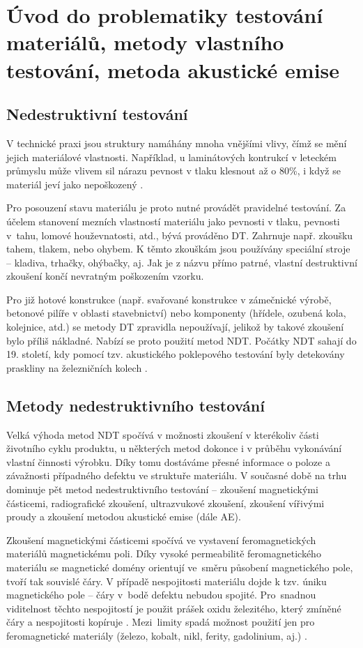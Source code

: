 \chapter{Úvod do problematiky testování materiálů, metody vlastního testování, metoda akustické emise}

\section{Nedestruktivní testování}
V technické praxi jsou struktury namáhány mnoha vnějšími vlivy, čímž se mění jejich materiálové vlastnosti. Například, u laminátových kontrukcí v leteckém průmyslu může vlivem sil nárazu pevnost v tlaku klesnout až o 80\%, i když se materiál jeví jako nepoškozený \cite{Benes_podklad_advances}. 

Pro posouzení stavu materiálu je proto nutné provádět pravidelné testování.
Za účelem stanovení mezních vlastností materiálu jako pevnosti v tlaku, pevnosti v~tahu, lomové houževnatosti, atd., bývá prováděno \ac{DT}. Zahrnuje např. zkoušku tahem, tlakem, nebo ohybem. K těmto zkouškám jsou používány speciální stroje – kladiva, trhačky, ohýbačky, aj. Jak je z názvu přímo patrné, vlastní destruktivní zkoušení končí nevratným poškozením vzorku. 

Pro již hotové konstrukce (např. svařované konstrukce v zámečnické výrobě, betonové pilíře v oblasti stavebnictví) nebo komponenty (hřídele, ozubená kola, kolejnice, atd.) se metody \ac{DT} zpravidla nepoužívají, jelikož by takové zkoušení bylo příliš nákladné. Nabízí se proto použití metod \ac{NDT}. Počátky \ac{NDT} sahají do 19. století, kdy pomocí tzv. akustického poklepového testování byly detekovány praskliny na železničních kolech \cite{ConcretetestingHELAL}.
\section{Metody nedestruktivního testování}
Velká výhoda metod \ac{NDT} spočívá v možnosti zkoušení v kterékoliv části životního cyklu produktu, u některých metod dokonce i v průběhu vykonávání vlastní činnosti výrobku. Díky tomu dostáváme přesné informace o poloze a závažnosti případného defektu ve struktuře materiálu. V současné době na trhu dominuje pět metod nedestruktivního testování – zkoušení magnetickými částicemi, radiografické zkoušení, ultrazvukové zkoušení, zkoušení vířivými proudy a zkoušení metodou akustické emise (dále AE).

Zkoušení magnetickými částicemi spočívá ve vystavení feromagnetických materiálů magnetickému poli. Díky vysoké permeabilitě feromagnetického materiálu se magnetické domény orientují ve~směru působení magnetického pole, tvoří tak souvislé čáry. V případě nespojitosti materiálu dojde k tzv. úniku magnetického pole – čáry v~bodě defektu nebudou spojité. Pro~snadnou viditelnost těchto nespojitostí je použit prášek oxidu železitého, který zmíněné čáry a nespojitosti kopíruje \cite{Gupta_ADVANCES_IN_MATERIALS_AND_PROCESSING_TECHNOLOGIES}. Mezi~limity spadá možnost použití jen pro feromagnetické materiály (železo, kobalt, nikl, ferity, gadolinium, aj.) \cite{Sandeep_Kumar_Dwivedi_NDT}.


